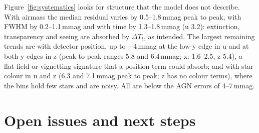 \documentclass[10pt,a4paper,oneside]{report}
\renewcommand{\_}{\oldunderscore\allowbreak}
\begin{document}
Figure~\ref{fig:systematics} looks for structure that the model does not describe. With airmass the
median residual varies by 0.5--1.8\,mmag peak to peak, with FWHM by 0.2--1.1\,mmag and with time by
1.3--1.8\,mmag (u 3.2): extinction, transparency and seeing are absorbed by $\Delta T_t$, as intended.
The largest remaining trends are with detector position, up to $-4$\,mmag at the low-y edge in u and at
both y edges in z (peak-to-peak ranges 5.8 and 6.4\,mmag; x: 1.6--2.5, z 5.4), a flat-field or vignetting
signature that a position term could absorb; and with star colour in u and z (6.3 and 7.1\,mmag peak to
peak; z has no colour terms), where the bins hold few stars and are noisy. All are below the AGN errors
of 4--7\,mmag.

\chapter{Open issues and next steps}
\label{ch:future}
\end{document}

